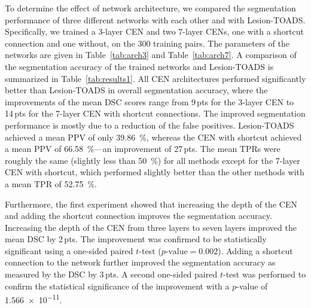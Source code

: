 To determine the effect of network architecture, we compared the segmentation
performance of three different networks with each other and with Lesion-TOADS.
Specifically, we trained a 3-layer CEN and two 7-layer CENs, one with a shortcut
connection and one without, on the 300 training pairs. The parameters of the
networks are given in Table~\ref{tab:arch3} and Table~\ref{tab:arch7}.
A comparison of the segmentation accuracy of the trained networks and
Lesion-TOADS is summarized in Table~\ref{tab:results1}. All CEN architectures
performed significantly better than Lesion-TOADS in overall segmentation
accuracy, where the improvements of the mean DSC scores range from 9\,pts for
the 3-layer CEN to 14\,pts for the 7-layer CEN with shortcut connections. The
improved segmentation performance is mostly due to a reduction of the false
positives. Lesion-TOADS achieved a mean PPV of only \SI{39.86}{\percent},
whereas the CEN with shortcut achieved a mean PPV of \SI{66.58}{\percent}---an
improvement of 27\,pts. The mean TPRs were roughly the same (slightly less than
\SI{50}{\percent}) for all methods except for the 7-layer CEN with shortcut,
which performed slightly better than the other methods with a mean TPR of
\SI{52.75}{\percent}.

Furthermore, the first experiment showed that increasing the depth of the CEN
and adding the shortcut connection improves the segmentation accuracy.
Increasing the depth of the CEN from three layers to seven layers improved the
mean DSC by 2\,pts. The improvement was confirmed to be statistically
significant using a one-sided paired $t$-test ($p\text{-value}=\num{0.002}$).
Adding a shortcut connection to the network further improved the segmentation
accuracy as measured by the DSC by 3\,pts. A second one-sided paired $t$-test
was performed to confirm the statistical significance of the improvement with a
$p$-value of \num{1.566e-11}.


